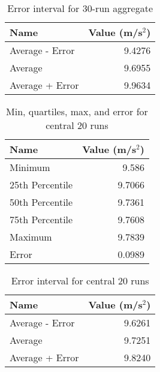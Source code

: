 \begin{table}[ht]
    \centering
    \begin{tabular}{|l|r|}
        \hline
        \textbf{Name} & \textbf{Value} (m/s$^{2}$) \\
        \hline
        Average - Error & 9.4276 \\
        Average & 9.6955 \\
        Average + Error & 9.9634 \\
        \hline
    \end{tabular}
    \caption{Error interval for 30-run aggregate}
    \label{table:01.error.30}
\end{table}
\begin{table}[ht]
    \centering
    \begin{tabular}{|l|r|}
        \hline
        \textbf{Name} & \textbf{Value} (m/s$^{2}$) \\
        \hline
        Minimum & 9.586 \\
        25th Percentile & 9.7066 \\
        50th Percentile & 9.7361 \\
        75th Percentile & 9.7608 \\
        Maximum & 9.7839 \\
        Error & 0.0989 \\
        \hline
    \end{tabular}
    \caption{Min, quartiles, max, and error for central 20 runs}
    \label{table:01.describe.20.center}
\end{table}
\begin{table}[ht]
    \centering
    \begin{tabular}{|l|r|}
        \hline
        \textbf{Name} & \textbf{Value} (m/s$^{2}$) \\
        \hline
        Average - Error & 9.6261 \\
        Average & 9.7251 \\
        Average + Error & 9.8240 \\
        \hline
    \end{tabular}
    \caption{Error interval for central 20 runs}
    \label{table:01.error.20.center}
\end{table}
